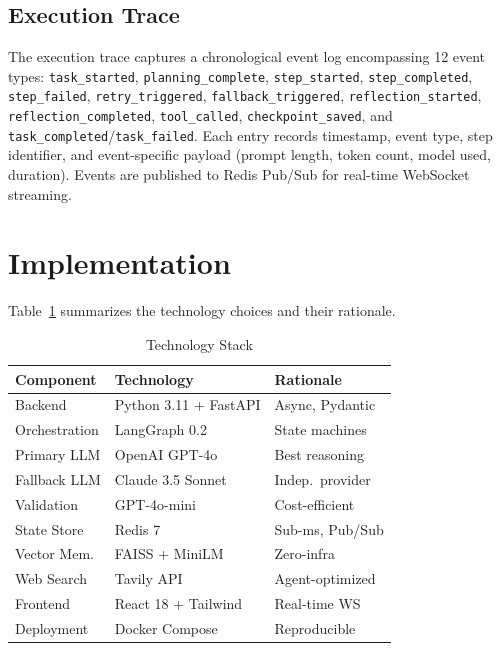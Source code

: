 \documentclass[conference]{IEEEtran}
\begin{document}
\subsection{Execution Trace}
\label{sec:trace}

The execution trace captures a chronological event log encompassing 12 event types: \texttt{task\_started}, \texttt{planning\_complete}, \texttt{step\_started}, \texttt{step\_completed}, \texttt{step\_failed}, \texttt{retry\_triggered}, \texttt{fallback\_triggered}, \texttt{reflection\_started}, \texttt{reflection\_completed}, \texttt{tool\_called}, \texttt{checkpoint\_saved}, and \texttt{task\_completed}/\texttt{task\_failed}. Each entry records timestamp, event type, step identifier, and event-specific payload (prompt length, token count, model used, duration). Events are published to Redis Pub/Sub for real-time WebSocket streaming.

\section{Implementation}

Table~\ref{tab:techstack} summarizes the technology choices and their rationale.

\begin{table}[htbp]
    \caption{Technology Stack}
    \label{tab:techstack}
    \centering
    \begin{tabular}{@{}lll@{}}
        \toprule
        \textbf{Component} & \textbf{Technology} & \textbf{Rationale} \\
        \midrule
        Backend & Python 3.11 + FastAPI & Async, Pydantic \\
        Orchestration & LangGraph 0.2 & State machines \\
        Primary LLM & OpenAI GPT-4o & Best reasoning \\
        Fallback LLM & Claude 3.5 Sonnet & Indep.\ provider \\
        Validation & GPT-4o-mini & Cost-efficient \\
        State Store & Redis 7 & Sub-ms, Pub/Sub \\
        Vector Mem. & FAISS + MiniLM & Zero-infra \\
        Web Search & Tavily API & Agent-optimized \\
        Frontend & React 18 + Tailwind & Real-time WS \\
        Deployment & Docker Compose & Reproducible \\
        \bottomrule
    \end{tabular}
\end{table}
\end{document}
